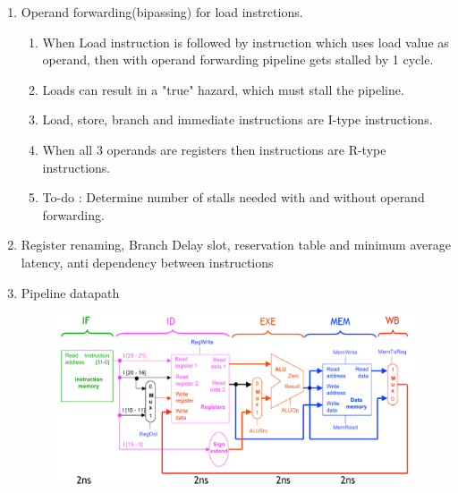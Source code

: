 \begin{enumerate}
    \newpage

    \item Operand forwarding(bipassing) for load instrctions.
    \begin{enumerate}
        \item When Load instruction is followed by instruction which uses load value as operand, then
              with operand forwarding pipeline gets stalled by 1 cycle.
        \item Loads can result in a "true" hazard, which must stall the pipeline.
        \item Load, store, branch and immediate instructions are I-type instructions.
        \item When all 3 operands are registers then instructions are R-type instructions.
        \item To-do : Determine number of stalls needed with and without operand forwarding.
    \end{enumerate}

    \item Register renaming, Branch Delay slot, reservation table and minimum average latency,
          anti dependency between instructions

    \item Pipeline datapath \\
        \begin{figure}[h]
            \centering   \includegraphics[scale=0.5]{./images/pipeline_datapath.jpeg}
        \end{figure}

\end{enumerate}
